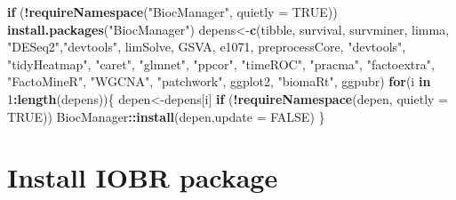 \documentclass[
  12pt,
]{book}
\newenvironment{Shaded}{\begin{snugshade}}{\end{snugshade}}
\newcommand{\AttributeTok}[1]{\textcolor[rgb]{0.13,0.29,0.53}{#1}}
\newcommand{\ConstantTok}[1]{\textcolor[rgb]{0.56,0.35,0.01}{#1}}
\newcommand{\ControlFlowTok}[1]{\textcolor[rgb]{0.13,0.29,0.53}{\textbf{#1}}}
\newcommand{\DecValTok}[1]{\textcolor[rgb]{0.00,0.00,0.81}{#1}}
\newcommand{\FunctionTok}[1]{\textcolor[rgb]{0.13,0.29,0.53}{\textbf{#1}}}
\newcommand{\NormalTok}[1]{#1}
\newcommand{\OtherTok}[1]{\textcolor[rgb]{0.56,0.35,0.01}{#1}}
\newcommand{\SpecialCharTok}[1]{\textcolor[rgb]{0.81,0.36,0.00}{\textbf{#1}}}
\newcommand{\StringTok}[1]{\textcolor[rgb]{0.31,0.60,0.02}{#1}}
\theoremstyle{definition}
\theoremstyle{definition}
\theoremstyle{definition}
\theoremstyle{definition}
\theoremstyle{remark}
\begin{document}
\begin{Shaded}
\begin{Highlighting}[]
\ControlFlowTok{if}\NormalTok{ (}\SpecialCharTok{!}\FunctionTok{requireNamespace}\NormalTok{(}\StringTok{"BiocManager"}\NormalTok{, }\AttributeTok{quietly =} \ConstantTok{TRUE}\NormalTok{)) }\FunctionTok{install.packages}\NormalTok{(}\StringTok{"BiocManager"}\NormalTok{)}
\NormalTok{depens}\OtherTok{\textless{}{-}}\FunctionTok{c}\NormalTok{(}\StringTok{\textquotesingle{}tibble\textquotesingle{}}\NormalTok{, }\StringTok{\textquotesingle{}survival\textquotesingle{}}\NormalTok{, }\StringTok{\textquotesingle{}survminer\textquotesingle{}}\NormalTok{, }\StringTok{\textquotesingle{}limma\textquotesingle{}}\NormalTok{, }\StringTok{"DESeq2"}\NormalTok{,}\StringTok{"devtools"}\NormalTok{, }\StringTok{\textquotesingle{}limSolve\textquotesingle{}}\NormalTok{, }\StringTok{\textquotesingle{}GSVA\textquotesingle{}}\NormalTok{, }\StringTok{\textquotesingle{}e1071\textquotesingle{}}\NormalTok{, }\StringTok{\textquotesingle{}preprocessCore\textquotesingle{}}\NormalTok{, }
          \StringTok{"devtools"}\NormalTok{, }\StringTok{"tidyHeatmap"}\NormalTok{, }\StringTok{"caret"}\NormalTok{, }\StringTok{"glmnet"}\NormalTok{, }\StringTok{"ppcor"}\NormalTok{,  }\StringTok{"timeROC"}\NormalTok{, }\StringTok{"pracma"}\NormalTok{, }\StringTok{"factoextra"}\NormalTok{, }
          \StringTok{"FactoMineR"}\NormalTok{, }\StringTok{"WGCNA"}\NormalTok{, }\StringTok{"patchwork"}\NormalTok{, }\StringTok{\textquotesingle{}ggplot2\textquotesingle{}}\NormalTok{, }\StringTok{"biomaRt"}\NormalTok{, }\StringTok{\textquotesingle{}ggpubr\textquotesingle{}}\NormalTok{)}
\ControlFlowTok{for}\NormalTok{(i }\ControlFlowTok{in} \DecValTok{1}\SpecialCharTok{:}\FunctionTok{length}\NormalTok{(depens))\{}
\NormalTok{  depen}\OtherTok{\textless{}{-}}\NormalTok{depens[i]}
  \ControlFlowTok{if}\NormalTok{ (}\SpecialCharTok{!}\FunctionTok{requireNamespace}\NormalTok{(depen, }\AttributeTok{quietly =} \ConstantTok{TRUE}\NormalTok{))  BiocManager}\SpecialCharTok{::}\FunctionTok{install}\NormalTok{(depen,}\AttributeTok{update =} \ConstantTok{FALSE}\NormalTok{)}
\NormalTok{\}}
\end{Highlighting}
\end{Shaded}

\hypertarget{install-iobr-package}{%
\section{Install IOBR package}\label{install-iobr-package}}
\end{document}
